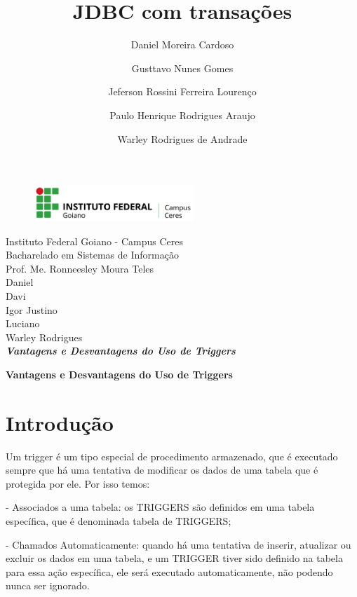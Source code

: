 \documentclass[12pt,a4paper]{article}
\title{JDBC com transações}
\author{Daniel Moreira Cardoso \and Gusttavo Nunes Gomes\and Jeferson Rossini Ferreira Lourenço\and Paulo Henrique Rodrigues Araujo\and Warley Rodrigues de Andrade}
\begin{document}
\begin{titlepage}
\begin{center}
\begin{figure}[htb]
                
                \label{figura:LogoIF}
        
                \centering
                \includegraphics[width=6cm]{recursos/imagens/logo.png} 
\end{figure}
Instituto Federal Goiano - Campus Ceres\\
Bacharelado em Sistemas de Informação\\
Prof. Me. Ronneesley Moura Teles\\\vspace{0.5cm}
Daniel \\
Davi\\
Igor Justino\\
Luciano\\
Warley Rodrigues\\
\vspace{5.0cm}
\textit{\textbf{\Large{Vantagens e Desvantagens do Uso de Triggers}}}\\\vspace{0.5cm}
\vspace{9.5cm}
\end{center}
\end{titlepage}
\tableofcontents
\newpage
\begin{center}
\textbf{\Large{Vantagens e Desvantagens do Uso de Triggers}}\\\vspace{0.5cm}
\end{center}
\section{Introdução}
Um trigger é um tipo especial de procedimento armazenado, que é executado sempre que há uma tentativa de modificar os dados de uma tabela que é protegida por ele. Por isso temos:

 - Associados a uma tabela: os TRIGGERS são definidos em uma tabela específica, que é denominada tabela de TRIGGERS;
 
 - Chamados Automaticamente: quando há uma tentativa de inserir, atualizar ou excluir os dados em uma tabela, e um TRIGGER tiver sido definido na tabela para essa ação específica, ele será executado automaticamente, não podendo nunca ser ignorado.
 
\end{document}
